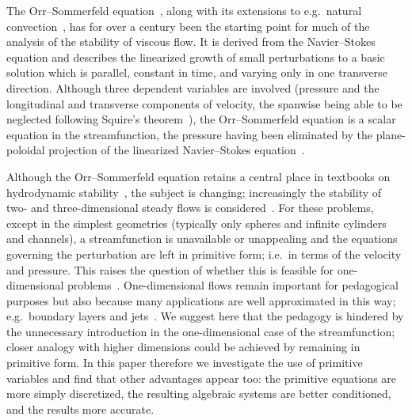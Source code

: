 \documentclass[twocolum]{afmc_art}
\begin{document}
The Orr--Sommerfeld equation~\cite[eq.\ 25.12]{drazin2004hydrodynamic}, along with its extensions to e.g.\ natural convection~\cite{gershuni1953ustoichivosti, plapp1957analytic}, has for over a century been the starting point for much of the analysis of the stability of viscous flow.  It is derived from the Navier--Stokes equation and describes the linearized growth of small perturbations to a basic solution which is parallel, constant in time, and varying only in one transverse direction.  Although three dependent variables are involved (pressure and the longitudinal and transverse components of velocity, the spanwise being able to be neglected following Squire's theorem~\cite{squire1933stability}), the Orr--Sommerfeld equation is a scalar equation in the streamfunction, the pressure having been eliminated by the plane-poloidal projection of the linearized Navier--Stokes equation~\cite{mcbain2005plane}.

Although the Orr--Sommerfeld equation retains a central place in textbooks on hydrodynamic stability~\cite{drazin2002introduction, criminale2003theory, drazin2004hydrodynamic, charru2007instabilites}, the subject is changing; increasingly the stability of two- and three-dimensional steady flows is considered~\cite{barkley2002threedimensional, theofilis2003advances, bengana2019bifurcation}.  For these problems, except in the simplest geometries (typically only spheres and infinite cylinders and channels), a streamfunction is unavailable or unappealing and the equations governing the perturbation are left in primitive form; i.e.\ in terms of the velocity and pressure.  This raises the question of whether this is feasible for one-dimensional problems~\cite{paredes2013order}.  One-dimensional flows remain important for pedagogical purposes but also because many applications are well approximated in this way; e.g.\ boundary layers and jets~\cite{varieras2007selfsustained}.  We suggest here that the pedagogy is hindered by the unnecessary introduction in the one-dimensional case of the streamfunction; closer analogy with higher dimensions could be achieved by remaining in primitive form.  In this paper therefore we investigate the use of primitive variables and find that other advantages appear too: the primitive equations are more simply discretized, the resulting algebraic systems are better conditioned, and the results more accurate.
\end{document}
